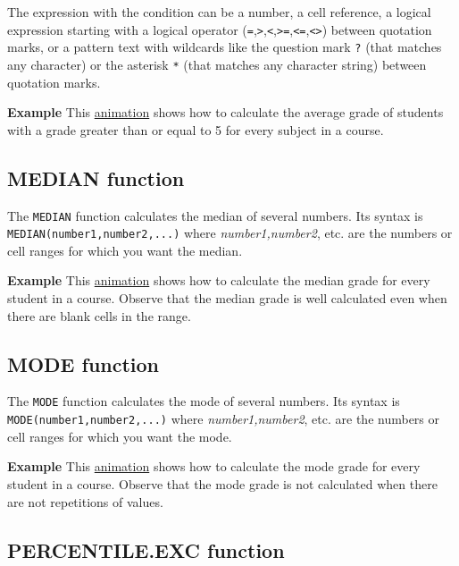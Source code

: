 The expression with the condition can be a number, a cell reference, a logical expression starting with a logical operator (\texttt{=},\texttt{\textgreater{}},\texttt{\textless{}},\texttt{\textgreater{}=},\texttt{\textless{}=},\texttt{\textless{}\textgreater{}}) between quotation marks, or a pattern text with wildcards like the question mark \texttt{?} (that matches any character) or the asterisk \texttt{*} (that matches any character string) between quotation marks.

\textbf{Example} This \href{http://aprendeconalf.es/office/excel/manual/img/example_function_averageif.gif}{animation} shows how to calculate the average grade of students with a grade greater than or equal to 5 for every subject in a course.

\subsection{MEDIAN function}\hypertarget{median-function}{}\label{median-function}

The \texttt{MEDIAN} function calculates the median of several numbers. Its syntax is \texttt{MEDIAN(number1,number2,...)} where \emph{number1,number2}, etc. are the numbers or cell ranges for which you want the median.

\textbf{Example} This \href{http://aprendeconalf.es/office/excel/manual/img/example_function_median.gif}{animation} shows how to calculate the median grade for every student in a course. Observe that the median grade is well calculated even when there are blank cells in the range.

\subsection{MODE function}\hypertarget{mode-function}{}\label{mode-function}

The \texttt{MODE} function calculates the mode of several numbers. Its syntax is \texttt{MODE(number1,number2,...)} where \emph{number1,number2}, etc. are the numbers or cell ranges for which you want the mode.

\textbf{Example} This \href{http://aprendeconalf.es/office/excel/manual/img/example_function_mode.gif}{animation} shows how to calculate the mode grade for every student in a course. Observe that the mode grade is not calculated when there are not repetitions of values.

\subsection{PERCENTILE.EXC function}\hypertarget{percentileexc-function}{}\label{percentileexc-function}

